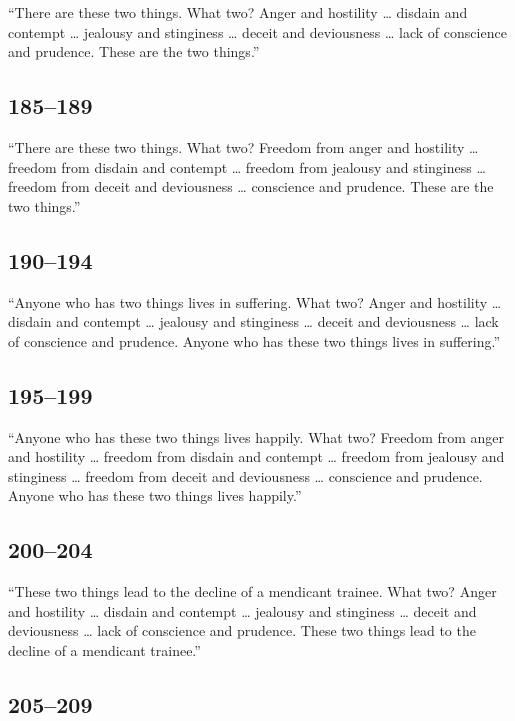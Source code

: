 \documentclass[12pt,openany]{book}%
\begin{document}
“There are these two things. What two? Anger and hostility … disdain and contempt … jealousy and stinginess … deceit and deviousness … lack of conscience and prudence. These are the two things.” 

\subsection*{185–189 }

“There are these two things. What two? Freedom from anger and hostility … freedom from disdain and contempt … freedom from jealousy and stinginess … freedom from deceit and deviousness … conscience and prudence. These are the two things.” 

\subsection*{190–194 }

“Anyone who has two things lives in suffering. What two? Anger and hostility … disdain and contempt … jealousy and stinginess … deceit and deviousness … lack of conscience and prudence. Anyone who has these two things lives in suffering.” 

\subsection*{195–199 }

“Anyone who has these two things lives happily. What two? Freedom from anger and hostility … freedom from disdain and contempt … freedom from jealousy and stinginess … freedom from deceit and deviousness … conscience and prudence. Anyone who has these two things lives happily.” 

\subsection*{200–204 }

“These two things lead to the decline of a mendicant trainee. What two? Anger and hostility … disdain and contempt … jealousy and stinginess … deceit and deviousness … lack of conscience and prudence. These two things lead to the decline of a mendicant trainee.” 

\subsection*{205–209 }
\end{document}
